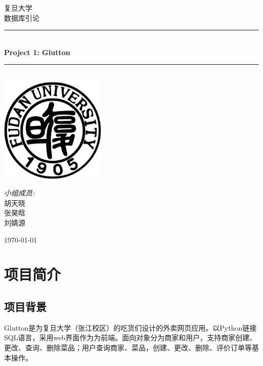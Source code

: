 \documentclass[12pt, oneside,a4paper]{article}
\newcommand{\HRule}{\rule{\linewidth}{0.5mm}}
\begin{document}
\begin{titlepage}
\begin{center}
\textsc{\LARGE 复旦大学}\\[1.5cm]
\textsc{\Large 数据库引论}\\[0.5cm]
\HRule \\[0.4cm]
{ \huge \bfseries Project 1: Glutton}\\[0.4cm]
\HRule \\[1.5cm]
\includegraphics[width=2in]{logo.jpg}\\[1cm]
\begin{minipage}{0.4\textwidth}
\begin{flushleft} \large
\begin{center}
\emph{小组成员:}\\
胡天晓\\
张昊晗\\
刘婧源
\end{center}
\end{flushleft}
\end{minipage}
\vfill
{\large \today}
\end{center}
\end{titlepage}

\section{项目简介}
\subsection{项目背景}
Glutton是为复旦大学（张江校区）的吃货们设计的外卖网页应用。以Python链接SQL语言，采用web界面作为为前端。面向对象分为商家和用户，支持商家创建、更改、查询、删除菜品；用户查询商家、菜品，创建、更改、删除、评价订单等基本操作。
\end{document}
